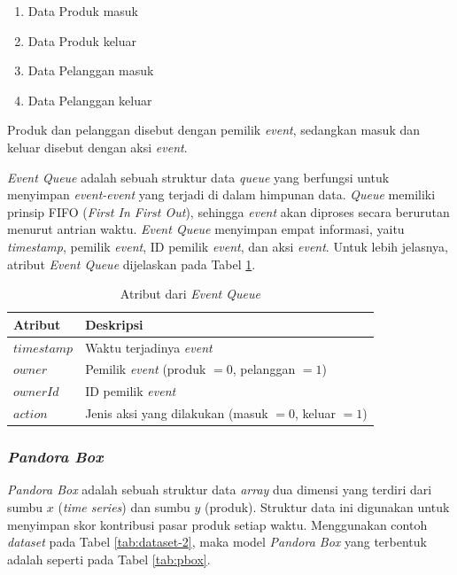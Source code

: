 \begin{enumerate}
	\item Data Produk masuk
	\item Data Produk keluar
	\item Data Pelanggan masuk
	\item Data Pelanggan keluar
\end{enumerate}
Produk dan pelanggan disebut dengan pemilik \textit{event}, sedangkan masuk dan keluar disebut dengan aksi \textit{event}.

\textit{Event Queue} adalah sebuah struktur data \textit{queue} yang berfungsi untuk menyimpan \textit{event-event} yang terjadi di dalam himpunan data. \textit{Queue} memiliki prinsip FIFO (\textit{First In First Out}), sehingga \textit{event} akan diproses secara berurutan menurut antrian waktu. \textit{Event Queue} menyimpan empat informasi, yaitu \textit{timestamp}, pemilik \textit{event}, ID pemilik \textit{event}, dan aksi \textit{event}. Untuk lebih jelasnya, atribut \textit{Event Queue} dijelaskan pada Tabel \ref{tab:attr-event-queue}.


\begin{table}[H]
	\centering
	\begin{tabular}{|p{2cm}|p{6cm}|}
		\hline
		\textbf{Atribut} & \textbf{Deskripsi} \\ \hline \hline
		$timestamp$ & Waktu terjadinya \textit{event} \\ \hline
		$owner$ & Pemilik \textit{event} (produk $= 0$, pelanggan $= 1$) \\ \hline
		$ownerId$ & ID pemilik \textit{event}\\ \hline
		$action$ & Jenis aksi yang dilakukan (masuk $= 0$, keluar $= 1$) \\ \hline
	\end{tabular} 
	\caption{Atribut dari \textit{Event Queue}}
	\label{tab:attr-event-queue}
\end{table}

\subsubsection{\textit{Pandora Box}}
\tab \textit{Pandora Box} adalah sebuah struktur data \textit{array} dua dimensi yang terdiri dari sumbu $x$ (\textit{time series}) dan sumbu $y$ (produk). Struktur data ini digunakan untuk menyimpan skor kontribusi pasar produk setiap waktu. Menggunakan contoh \textit{dataset} pada Tabel \ref{tab:dataset-2}, maka model \textit{Pandora Box} yang terbentuk adalah seperti pada Tabel \ref{tab:pbox}.  

